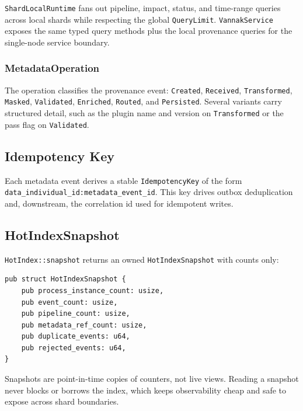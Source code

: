 \texttt{ShardLocalRuntime} fans out pipeline, impact, status, and time-range
queries across local shards while respecting the global \texttt{QueryLimit}.
\texttt{VannakService} exposes the same typed query methods plus the local
provenance queries for the single-node service boundary.

\subsubsection{MetadataOperation}

The operation classifies the provenance event: \texttt{Created},
\texttt{Received}, \texttt{Transformed}, \texttt{Masked}, \texttt{Validated},
\texttt{Enriched}, \texttt{Routed}, and \texttt{Persisted}. Several variants
carry structured detail, such as the plugin name and version on
\texttt{Transformed} or the pass flag on \texttt{Validated}.

\subsection{Idempotency Key}

Each metadata event derives a stable \texttt{IdempotencyKey} of the form
\texttt{data\_individual\_id:metadata\_event\_id}. This key drives outbox
deduplication and, downstream, the correlation id used for idempotent \ipto{}
writes.

\subsection{HotIndexSnapshot}

\texttt{HotIndex::snapshot} returns an owned \texttt{HotIndexSnapshot} with
counts only:

\begin{lstlisting}
pub struct HotIndexSnapshot {
    pub process_instance_count: usize,
    pub event_count: usize,
    pub pipeline_count: usize,
    pub metadata_ref_count: usize,
    pub duplicate_events: u64,
    pub rejected_events: u64,
}
\end{lstlisting}

\begin{vnote}
Snapshots are point-in-time copies of counters, not live views. Reading a
snapshot never blocks or borrows the index, which keeps observability cheap and
safe to expose across shard boundaries.
\end{vnote}

\endinput

\subsection{Metadata HTTP Capture}

